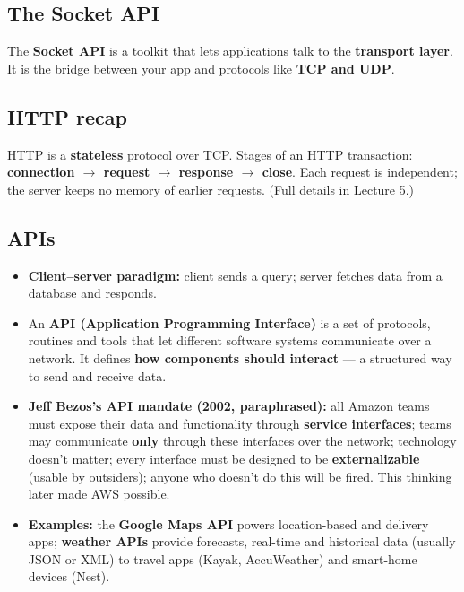 \subsection{The Socket API}
The \textbf{Socket API} is a toolkit that lets applications talk to the \textbf{transport layer}. It is the bridge between your app and protocols like \textbf{TCP and UDP}.
\begin{center}
\end{center}

\subsection{HTTP recap}
HTTP is a \textbf{stateless} protocol over TCP. Stages of an HTTP transaction: \textbf{connection $\to$ request $\to$ response $\to$ close}. Each request is independent; the server keeps no memory of earlier requests. (Full details in Lecture 5.)

\subsection{APIs}
\begin{itemize}
  \item \textbf{Client--server paradigm:} client sends a query; server fetches data from a database and responds.
  \item An \textbf{API (Application Programming Interface)} is a set of protocols, routines and tools that let different software systems communicate over a network. It defines \textbf{how components should interact} --- a structured way to send and receive data.
  \item \textbf{Jeff Bezos's API mandate (2002, paraphrased):} all Amazon teams must expose their data and functionality through \textbf{service interfaces}; teams may communicate \textbf{only} through these interfaces over the network; technology doesn't matter; every interface must be designed to be \textbf{externalizable} (usable by outsiders); anyone who doesn't do this will be fired. This thinking later made AWS possible.
  \item \textbf{Examples:} the \textbf{Google Maps API} powers location-based and delivery apps; \textbf{weather APIs} provide forecasts, real-time and historical data (usually JSON or XML) to travel apps (Kayak, AccuWeather) and smart-home devices (Nest).
\end{itemize}

